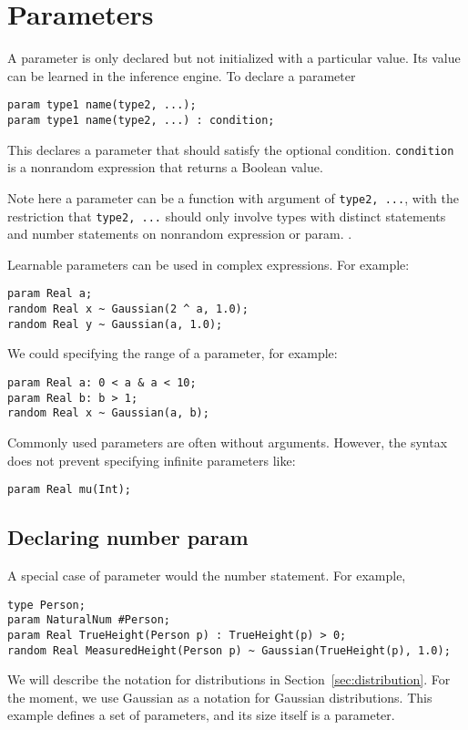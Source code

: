 \documentclass[12pt]{article}
\begin{document}
\section{Parameters}
A parameter is only declared but not initialized with a particular value. Its value can be learned in the inference engine. To declare a parameter
\begin{verbatim}
param type1 name(type2, ...);
param type1 name(type2, ...) : condition;
\end{verbatim} 
This declares a parameter that should satisfy the optional condition. \texttt{condition} is a nonrandom expression that returns a Boolean value. 

Note here a parameter can be a function with argument of \texttt{type2, ...}, with the restriction that \texttt{type2, ...} should only involve types with distinct statements and number statements on nonrandom expression or param.
. 

Learnable parameters can be used in complex expressions. For example:
\begin{verbatim}
param Real a;
random Real x ~ Gaussian(2 ^ a, 1.0);
random Real y ~ Gaussian(a, 1.0);
\end{verbatim}

We could specifying the range of a parameter, for example:
\begin{verbatim}
param Real a: 0 < a & a < 10;
param Real b: b > 1;
random Real x ~ Gaussian(a, b);
\end{verbatim}

Commonly used parameters are often without arguments. However, the syntax does not prevent specifying infinite parameters like:
\begin{verbatim}
param Real mu(Int);
\end{verbatim}

\subsection{Declaring number param}
A special case of parameter would the number statement. For example,
\begin{verbatim}
type Person;
param NaturalNum #Person;
param Real TrueHeight(Person p) : TrueHeight(p) > 0;
random Real MeasuredHeight(Person p) ~ Gaussian(TrueHeight(p), 1.0);
\end{verbatim}
We will describe the notation for distributions in Section~\ref{sec:distribution}. For the moment, we use Gaussian as a notation for Gaussian distributions.
This example defines a set of parameters, and its size itself is a parameter.
\end{document}
